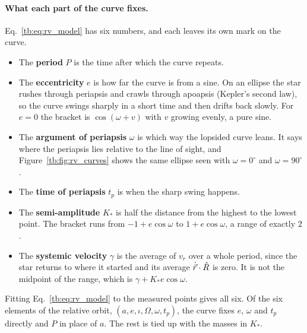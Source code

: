 \paragraph{What each part of the curve fixes.} Eq.~\eqref{tb:eq:rv_model} has six numbers, and each leaves its own mark on the curve.
\begin{itemize}
	\item The \textbf{period} $P$ is the time after which the curve repeats.
	\item The \textbf{eccentricity} $e$ is how far the curve is from a sine. On an ellipse the star rushes through periapsis and crawls through apoapsis (Kepler's second law), so the curve swings sharply in a short time and then drifts back slowly. For $e=0$ the bracket is $\cos(\omega+v)$ with $v$ growing evenly, a pure sine.
	\item The \textbf{argument of periapsis} $\omega$ is which way the lopsided curve leans. It says where the periapsis lies relative to the line of sight, and Figure~\ref{tb:fig:rv_curves} shows the same ellipse seen with $\omega=0^\circ$ and $\omega=90^\circ$.
	\item The \textbf{time of periapsis} $t_p$ is when the sharp swing happens.
	\item The \textbf{semi-amplitude} $K_*$ is half the distance from the highest to the lowest point. The bracket runs from $-1+e\cos\omega$ to $1+e\cos\omega$, a range of exactly $2$.
	\item The \textbf{systemic velocity} $\gamma$ is the average of $v_r$ over a whole period, since the star returns to where it started and its average $\dot{\vec r}\cdot\hat R$ is zero. It is not the midpoint of the range, which is $\gamma+K_*e\cos\omega$.
\end{itemize}
Fitting Eq.~\eqref{tb:eq:rv_model} to the measured points gives all six. Of the six elements of the relative orbit, $(a,e,\iota,\Omega,\omega,t_p)$, the curve fixes $e$, $\omega$ and $t_p$ directly and $P$ in place of $a$. The rest is tied up with the masses in $K_*$.

